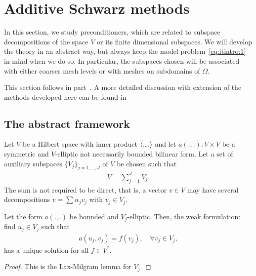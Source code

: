 
\section{Additive Schwarz methods}

\begin{intro}
  In this section, we study preconditioners, which are related to
  subspace decompositions of the space $V$ or its finite dimensional
  subspaces. We will develop the theory in an abstract way, but always
  keep the model problem~\eqref{eq:itintro:1} in mind when we do so. In
  particular, the subspaces chosen will be associated with either
  coarser mesh levels or with meshes on subdomains of $\Omega$.
  
  This section follows in part~\cite[Chapter 7]{BrennerScott02}. A
  more detailed discussion with extension of the methods developed
  here can be found in~\cite{ToselliWidlund05}
\end{intro}

\subsection{The abstract framework}

\begin{intro}
  Let $V$ be a Hilbert space with inner product $\scal(.,.)$
  and let $a(.,.): V\times V$ be a
  symmetric and $V$-elliptic not necessarily bounded bilinear form.
  Let a set of auxiliary
  subspaces $\{V_j\}_{j=1,\dots,J}$ of $V$ be chosen such that
  \begin{gather*}
    V = \sum_{j=1}^J V_j.
  \end{gather*}
  The sum is not required to be direct, that is, a vector $v\in V$
  may have several decompositions $v = \sum \alpha_j v_j$ with $v_j\in
  V_j$.
\end{intro}

\begin{lemma}
  \label{lemma:schwarz:1}
  Let the form $a(.,.)$ be bounded and $V_j$-elliptic. Then, the weak
  formulation: find $u_j\in V_j$ such that
  \begin{gather}
    \label{eq:schwarz:1}
    a(u_j,v_j) = f(v_j),
    \quad\forall v_j\in V_j,
  \end{gather}
  has a unique solution for all $f\in V^*$.
\end{lemma}

\begin{proof}
  This is the Lax-Milgram lemma for $V_j$.
\end{proof}

